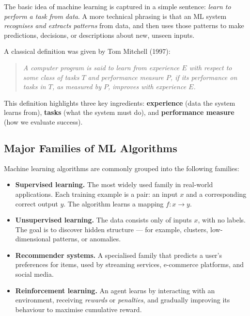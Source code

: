 The basic idea of machine learning is captured in a simple sentence:
\emph{learn to perform a task from data}. A more technical phrasing is that an
ML system \emph{recognises and extracts patterns} from data, and then uses those
patterns to make predictions, decisions, or descriptions about new, unseen
inputs.

A classical definition was given by Tom Mitchell (1997):

\begin{quote}
\itshape
A computer program is said to learn from experience $E$ with respect to some
class of tasks $T$ and performance measure $P$, if its performance on tasks in
$T$, as measured by $P$, improves with experience $E$.
\end{quote}

This definition highlights three key ingredients: \textbf{experience} (data the
system learns from), \textbf{tasks} (what the system must do), and
\textbf{performance measure} (how we evaluate success).

\subsection{Major Families of ML Algorithms}

Machine learning algorithms are commonly grouped into the following families:

\begin{itemize}
\item \textbf{Supervised learning.} The most widely used family in real-world
  applications. Each training example is a pair: an input $x$ and a
  corresponding correct output $y$. The algorithm learns a mapping
  $f\colon x \to y$.
\item \textbf{Unsupervised learning.} The data consists only of inputs $x$,
  with no labels. The goal is to discover hidden structure --- for example,
  clusters, low-dimensional patterns, or anomalies.
\item \textbf{Recommender systems.} A specialised family that predicts a
  user's preferences for items, used by streaming services, e-commerce
  platforms, and social media.
\item \textbf{Reinforcement learning.} An agent learns by interacting with an
  environment, receiving \emph{rewards} or \emph{penalties}, and gradually
  improving its behaviour to maximise cumulative reward.
\end{itemize}

